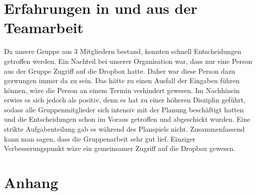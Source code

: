\documentclass[a4paper, 12pt]{report}
\begin{document}
\begin{flushleft}
\chapter{Erfahrungen in und aus der Teamarbeit}
Da unsere Gruppe aus 3 Mitgliedern bestand, konnten schnell Entscheidungen getroffen werden. 
Ein Nachteil bei unserer Organisation war, dass nur eine Person aus der Gruppe Zugriff auf die Dropbox hatte.
Daher war diese Person dazu gezwungen immer da zu sein.
Das hätte zu einen Ausfall der Eingaben führen können, wäre die Person an einem Termin verhindert gewesen.
Im Nachhinein erwies es sich jedoch als positiv, denn es hat zu einer höheren Disziplin geführt, sodass alle Gruppenmitglieder sich intensiv mit der Planung beschäftigt hatten und die Entscheidungen schon im Voraus getroffen und abgeschickt wurden.
Eine strikte Aufgabenteilung gab es während des Planspiels nicht.
Zusammenfassend kann man sagen, dass die Gruppenarbeit sehr gut lief.
Einziger Verbesserungspunkt wäre ein gemeinsamer Zugriff auf die Dropbox gewesen. 

\chapter{Anhang}
%
%


%
 
%
%
%
%
%
%
%
%



 
 \listoffigures
 

\end{flushleft}
\end{document}
